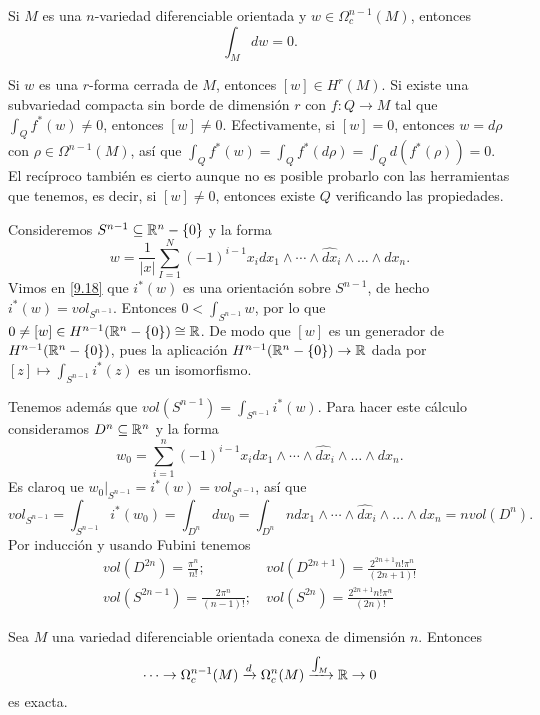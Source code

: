 \documentclass[CV.tex]{subfiles}
\begin{document}
\begin{coro}
Si $M$ es una $n$-variedad diferenciable orientada y $w\in \Omega_c^{n-1}(M)$, entonces
\[
\int_M dw=0.
\]
\end{coro}

\begin{nota}
Si $w$ es una $r$-forma cerrada de $M$, entonces $[w]\in H^r(M)$. Si existe una subvariedad compacta sin borde de dimensión $r$ con $f:Q\to M$ tal que $\int_Q f^*(w)\neq 0$, entonces $[w]\neq 0$. Efectivamente, si $[w]=0$, entonces $w=d\rho$ con $\rho\in \Omega^{n-1}(M)$, así que $\int_Q f^*(w)=\int_Q f^*(d\rho)=\int_Q d(f^*(\rho))=0$. El recíproco también es cierto aunque no es posible probarlo con las herramientas que tenemos, es decir, si $[w]\neq 0$, entonces existe $Q$ verificando las propiedades.
\end{nota}

\begin{ej}
Consideremos $S^{n-1}\subseteq\mathbb{R}^n-\{0\}$ y la forma 
\[
w=\frac{1}{|x|}\sum_{I=1}^N(-1)^{i-1}x_i dx_1\land\cdots\land \hat{dx}_i\land\dots\land dx_n.
\]
Vimos en \ref{9.18} que $i^*(w)$ es una orientación sobre $S^{n-1}$, de hecho $i^*(w)=vol_{S^{n-1}}$. Entonces $0<\int_{S^{n-1}} w$, por lo que $0\neq [w]\in H^{n-1}(\mathbb{R}^n-\{0\})\cong\mathbb{R}$. De modo que $[w]$ es un generador de $H^{n-1}(\mathbb{R}^n-\{0\})$, pues la aplicación $H^{n-1}(\mathbb{R}^n-\{0\})\to\mathbb{R}$ dada por $[z]\mapsto \int_{S^{n-1}}i^*(z)$ es un isomorfismo. 

Tenemos además que $vol(S^{n-1})=\int_{S^{n-1}} i^*(w)$. Para hacer este cálculo consideramos $D^n\subseteq\mathbb{R}^n$ y la forma $$w_0=\sum_{i=1}^n (-1)^{i-1} x_idx_1\land\cdots\land \hat{dx}_i\land\dots\land dx_n.$$
Es claroq ue $w_0|_{S^{n-1}}=i^*(w)=vol_{S^{n-1}}$, así que
\[
vol_{S^{n-1}}=\int_{S^{n-1}} i^*(w_0)=\int_{D^n} dw_0=\int_{D^n} n dx_1\land\cdots\land \hat{dx}_i\land\dots\land dx_n=nvol(D^n).
\]
Por inducción y usando Fubini tenemos 
\begin{align*}
vol(D^{2n})=\frac{\pi^n}{n!};\ & vol(D^{2n+1})=\frac{2^{2n+1}n!\pi^n}{(2n+1)!}\\
vol(S^{2n-1})=\frac{2\pi^n}{(n-1)!};\ & vol(S^{2n})=\frac{2^{2n+1}n!\pi^n}{(2n)!}
\end{align*}
\end{ej}

\begin{teorema}\label{aumento}
Sea $M$ una variedad diferenciable orientada conexa de dimensión $n$. Entonces
\[
\cdots\to\Omega_c^{n-1}(M)\xrightarrow{d}\Omega_c^{n}(M)\xrightarrow{\int_M}\mathbb{R}\to 0
\]
es exacta.
\end{teorema}
\end{document}
